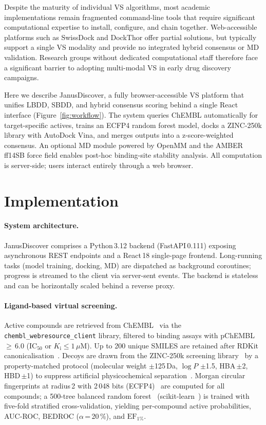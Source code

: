 \documentclass[12pt,a4paper]{article}
\begin{document}
Despite the maturity of individual VS algorithms, most academic
implementations remain fragmented command-line tools that require
significant computational expertise to install, configure, and chain
together.  Web-accessible platforms such as SwissDock and DockThor offer
partial solutions, but typically support a single VS modality and provide
no integrated hybrid consensus or MD validation.  Research groups without
dedicated computational staff therefore face a significant barrier to
adopting multi-modal VS in early drug discovery campaigns.

Here we describe JanusDiscover, a fully browser-accessible VS platform
that unifies LBDD, SBDD, and hybrid consensus scoring behind a single
React interface (Figure~\ref{fig:workflow}).  The system queries ChEMBL
automatically for target-specific actives, trains an ECFP4 random forest
model, docks a ZINC-250k library with AutoDock Vina, and merges outputs
into a z-score-weighted consensus.  An optional MD module powered by
OpenMM and the AMBER ff14SB force field enables post-hoc binding-site
stability analysis.  All computation is server-side; users interact
entirely through a web browser.

\section*{Implementation}

\paragraph{System architecture.}
JanusDiscover comprises a Python\,3.12 backend (FastAPI\,0.111) exposing
asynchronous REST endpoints and a React\,18 single-page frontend.
Long-running tasks (model training, docking, MD) are dispatched as
background coroutines; progress is streamed to the client via server-sent
events.  The backend is stateless and can be horizontally scaled behind a
reverse proxy.

\paragraph{Ligand-based virtual screening.}
Active compounds are retrieved from ChEMBL~\cite{gaulton2012chembl} via the
\texttt{chembl\_webresource\_client} library, filtered to binding assays
with pChEMBL\,$\geq$\,6.0 (IC$_{50}$ or $K_\mathrm{i} \leq 1\,\mu$M).
Up to 200 unique SMILES are retained after RDKit
canonicalisation~\cite{rdkit}.  Decoys are drawn from the ZINC-250k
screening library~\cite{irwin2012zinc} by a property-matched protocol
(molecular weight $\pm$125\,Da, $\log P$ $\pm$1.5, HBA\,$\pm$2,
HBD\,$\pm$1) to suppress artificial physicochemical
separation~\cite{mysinger2012dud}.  Morgan circular fingerprints at
radius\,2 with 2\,048 bits (ECFP4)~\cite{rogers2010extended} are computed
for all compounds; a 500-tree balanced random forest~\cite{breiman2001random}
(scikit-learn~\cite{pedregosa2011scikit}) is trained with five-fold
stratified cross-validation, yielding per-compound active probabilities,
AUC-ROC, BEDROC ($\alpha$\,=\,20\,\%), and $\text{EF}_{1\%}$.
\end{document}
